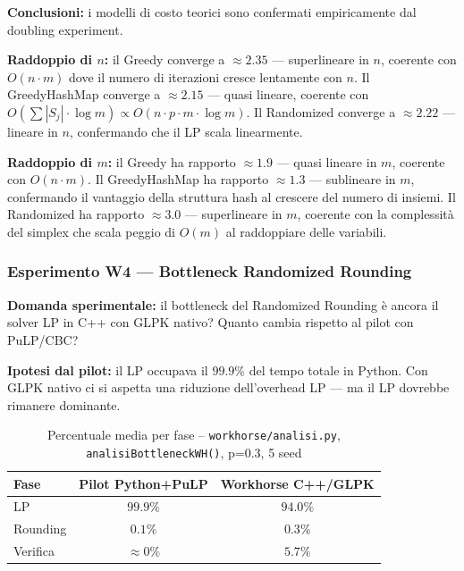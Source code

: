 \documentclass[12pt, a4paper]{article}
\begin{document}
\textbf{Conclusioni:} i modelli di costo teorici sono confermati 
empiricamente dal doubling experiment.

\textbf{Raddoppio di $n$:} il Greedy converge a $\approx 2.35$ — 
superlineare in $n$, coerente con $O(n \cdot m)$ dove il numero 
di iterazioni cresce lentamente con $n$. Il GreedyHashMap converge 
a $\approx 2.15$ — quasi lineare, coerente con 
$O(\sum|S_j| \cdot \log m) \propto O(n \cdot p \cdot m \cdot \log m)$. 
Il Randomized converge a $\approx 2.22$ — lineare in $n$, 
confermando che il LP scala linearmente.

\textbf{Raddoppio di $m$:} il Greedy ha rapporto $\approx 1.9$ — 
quasi lineare in $m$, coerente con $O(n \cdot m)$. 
Il GreedyHashMap ha rapporto $\approx 1.3$ — sublineare in $m$, 
confermando il vantaggio della struttura hash al crescere del numero 
di insiemi. Il Randomized ha rapporto $\approx 3.0$ — superlineare 
in $m$, coerente con la complessità del simplex che scala peggio 
di $O(m)$ al raddoppiare delle variabili.

\subsubsection{Esperimento W4 — Bottleneck Randomized Rounding}

\textbf{Domanda sperimentale:} il bottleneck del Randomized Rounding 
\`e ancora il solver LP in C++ con GLPK nativo? 
Quanto cambia rispetto al pilot con PuLP/CBC?

\textbf{Ipotesi dal pilot:} il LP occupava il $99.9\%$ del tempo 
totale in Python. Con GLPK nativo ci si aspetta una riduzione 
dell'overhead LP — ma il LP dovrebbe rimanere dominante.

\begin{table}[H]
\centering
\caption{Percentuale media per fase -- 
\texttt{workhorse/analisi.py}, \texttt{analisiBottleneckWH()}, p=0.3, 5 seed}
\label{tab:wh_bottleneck_pct}
\begin{tabular}{lcc}
\toprule
Fase & Pilot Python+PuLP & Workhorse C++/GLPK \\
\midrule
LP       & $99.9\%$ & $94.0\%$ \\
Rounding & $0.1\%$  & $0.3\%$  \\
Verifica & $\approx 0\%$ & $5.7\%$ \\
\bottomrule
\end{tabular}
\end{table}
\end{document}
